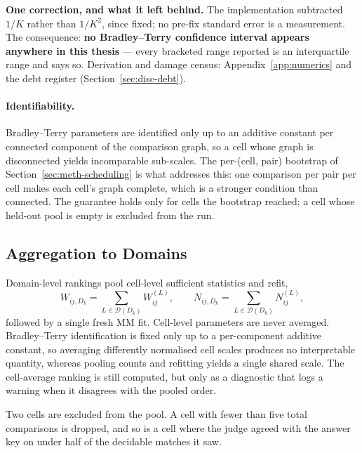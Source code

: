 \textbf{One correction, and what it left behind.}
The implementation subtracted $1/K$ rather than $1/K^{2}$, since
fixed; no pre-fix standard error is a measurement. The consequence:
\textbf{no Bradley--Terry confidence interval appears anywhere in
this thesis} --- every bracketed range reported is an interquartile
range and says so. Derivation and damage census:
Appendix~\ref{app:numerics} and the debt register
(Section~\ref{sec:disc-debt}).

\paragraph{Identifiability.}
Bradley--Terry parameters are identified only up to an additive
constant per connected component of the comparison graph, so a cell
whose graph is disconnected yields incomparable sub-scales. The
per-(cell, pair) bootstrap of Section~\ref{sec:meth-scheduling} is what
addresses this: one comparison per pair per cell makes each cell's
graph complete, which is a stronger condition than connected. The
guarantee holds only for cells the bootstrap reached; a cell whose
held-out pool is empty is excluded from the run.

\subsection{Aggregation to Domains}\label{sec:meth-aggregation}

Domain-level rankings pool cell-level sufficient statistics and refit,
\[
W_{ij,D_k} = \sum_{L \in \mathcal{D}(D_k)} W_{ij}^{(L)},
\qquad
N_{ij,D_k} = \sum_{L \in \mathcal{D}(D_k)} N_{ij}^{(L)},
\]
followed by a single fresh MM fit.
Cell-level parameters are never averaged. Bradley--Terry identification
is fixed only up to a per-component additive constant, so averaging
differently normalised cell scales produces no interpretable quantity,
whereas pooling counts and refitting yields a single shared scale. The
cell-average ranking is still computed, but only as a diagnostic that
logs a warning when it disagrees with the pooled order.

Two cells are excluded from the pool. A cell with fewer than five total
comparisons is dropped, and so is a cell where the judge agreed with
the answer key on under half of the decidable matches it saw.

